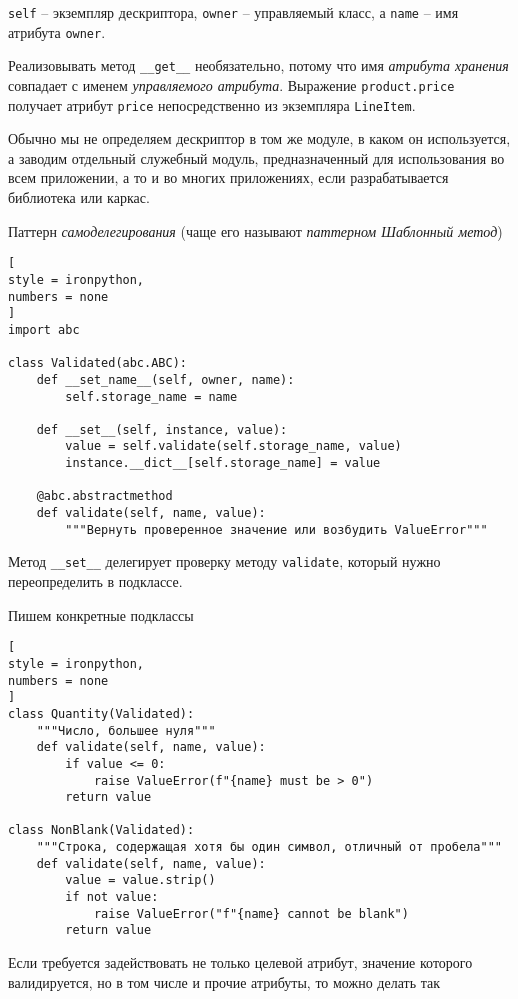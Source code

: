 \documentclass[%
	11pt,
	a4paper,
	utf8,
		]{article}
\begin{document}
\verb|self| -- экземпляр дескриптора, \verb*|owner| -- управляемый класс, а \verb|name| -- имя атрибута \verb*|owner|. 

Реализовывать метод \verb|__get__| необязательно, потому что имя \emph{атрибута хранения} совпадает с именем \emph{управляемого атрибута}. Выражение \verb*|product.price| получает атрибут \verb|price| непосредственно из экземпляра \verb*|LineItem|.

Обычно мы не определяем дескриптор в том же модуле, в каком он используется, а заводим отдельный служебный модуль, предназначенный для использования во всем приложении, а то и во многих приложениях, если разрабатывается библиотека или каркас.

Паттерн \emph{самоделегирования} (чаще его называют \emph{паттерном Шаблонный метод})
\begin{lstlisting}[
style = ironpython,
numbers = none
]
import abc

class Validated(abc.ABC):
    def __set_name__(self, owner, name):
        self.storage_name = name
        
    def __set__(self, instance, value):
        value = self.validate(self.storage_name, value)
        instance.__dict__[self.storage_name] = value
        
    @abc.abstractmethod
    def validate(self, name, value):
        """Вернуть проверенное значение или возбудить ValueError"""
\end{lstlisting}

Метод \verb|__set__| делегирует проверку методу \verb*|validate|, который нужно переопределить в подклассе.

Пишем конкретные подклассы
\begin{lstlisting}[
style = ironpython,
numbers = none
]
class Quantity(Validated):
    """Число, большее нуля"""
    def validate(self, name, value):
        if value <= 0:
            raise ValueError(f"{name} must be > 0")
        return value
        
class NonBlank(Validated):
    """Строка, содержащая хотя бы один символ, отличный от пробела"""
    def validate(self, name, value):
        value = value.strip()
        if not value:
            raise ValueError("f"{name} cannot be blank")
        return value
\end{lstlisting}

Если требуется задействовать не только целевой атрибут, значение которого валидируется, но в том числе и прочие атрибуты, то можно делать так
\end{document}
